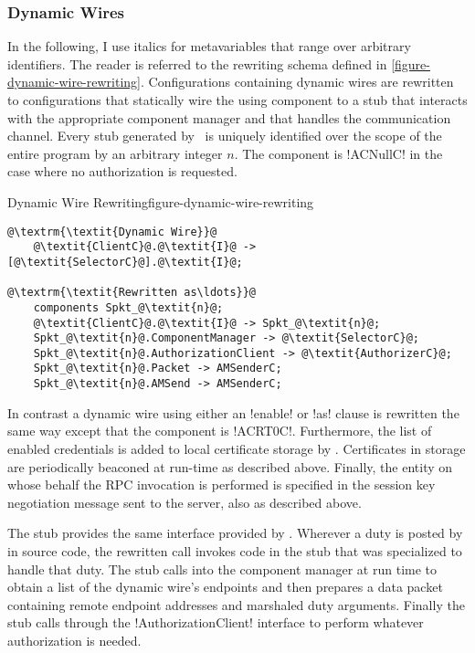 \subsubsection{Dynamic Wires}

In the following, I use italics for metavariables that range over arbitrary identifiers. The
reader is referred to the rewriting schema defined in \autoref{figure-dynamic-wire-rewriting}.
Configurations containing dynamic wires are rewritten to configurations that statically wire the
using component  to a stub  that interacts with
the appropriate component manager  and that handles the communication
channel. Every stub generated by \Sprocket\ is uniquely identified over the scope of the entire
program by an arbitrary integer $n$. The  component is !ACNullC! in
the case where no authorization is requested.

\begin{fpfig}[t]{Dynamic Wire Rewriting}{figure-dynamic-wire-rewriting}
{
\singlespace
\begin{lstlisting}[escapechar=@]
@\textrm{\textit{Dynamic Wire}}@
    @\textit{ClientC}@.@\textit{I}@ -> [@\textit{SelectorC}@].@\textit{I}@;

@\textrm{\textit{Rewritten as\ldots}}@
    components Spkt_@\textit{n}@;
    @\textit{ClientC}@.@\textit{I}@ -> Spkt_@\textit{n}@;
    Spkt_@\textit{n}@.ComponentManager -> @\textit{SelectorC}@;
    Spkt_@\textit{n}@.AuthorizationClient -> @\textit{AuthorizerC}@;
    Spkt_@\textit{n}@.Packet -> AMSenderC;
    Spkt_@\textit{n}@.AMSend -> AMSenderC;
\end{lstlisting}
\primaryspacing
}
\end{fpfig}

In contrast a dynamic wire using either an !enable! or !as! clause is rewritten the same way
except that the  component is !ACRT0C!. Furthermore, the list of
enabled credentials is added to local certificate storage by \Sprocket. Certificates in storage
are periodically beaconed at run-time as described above. Finally, the entity on whose behalf
the RPC invocation is performed is specified in the session key negotiation message sent to the
server, also as described above.

The  stub provides the same interface provided by
. Wherever a duty is posted by  in source code,
the rewritten call invokes code in the stub that was specialized to handle that duty. The stub
calls into the component manager at run time to obtain a list of the dynamic wire's endpoints
and then prepares a data packet containing remote endpoint addresses and marshaled duty
arguments. Finally the stub calls through the !AuthorizationClient! interface to perform
whatever authorization is needed.

